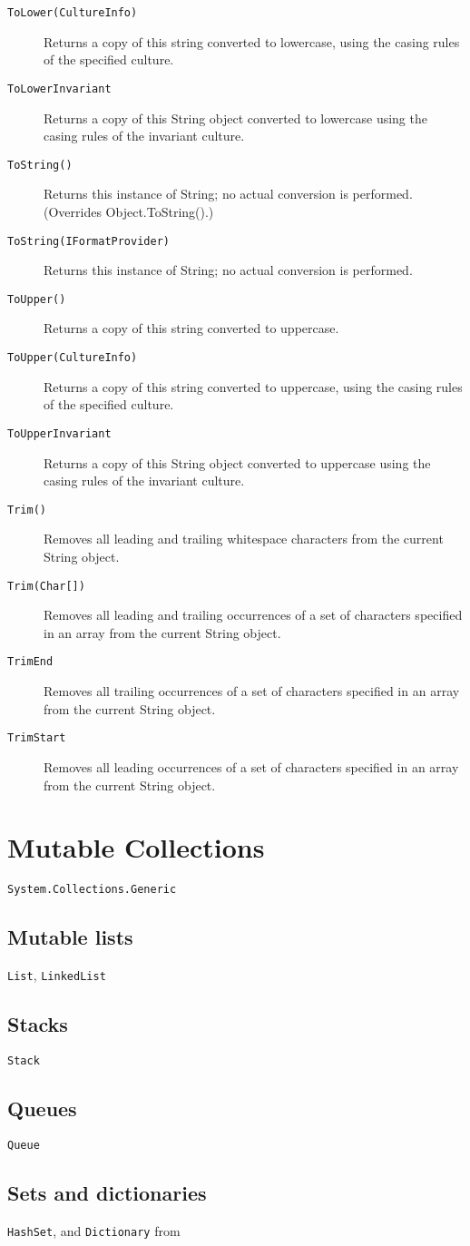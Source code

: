 \begin{description}
\item[\texttt{ToLower(CultureInfo)}] Returns a copy of this string converted to lowercase, using the casing rules of the specified culture.
\item[\texttt{ToLowerInvariant}] Returns a copy of this String object converted to lowercase using the casing rules of the invariant culture.
\item[\texttt{ToString()}] Returns this instance of String; no actual conversion is performed. (Overrides Object.ToString().)
\item[\texttt{ToString(IFormatProvider)}] Returns this instance of String; no actual conversion is performed.
\item[\texttt{ToUpper()}] Returns a copy of this string converted to uppercase.
\item[\texttt{ToUpper(CultureInfo)}] Returns a copy of this string converted to uppercase, using the casing rules of the specified culture.
\item[\texttt{ToUpperInvariant}] Returns a copy of this String object converted to uppercase using the casing rules of the invariant culture.
\item[\texttt{Trim()}] Removes all leading and trailing whitespace characters from the current String object.
\item[\texttt{Trim(Char[])}] Removes all leading and trailing occurrences of a set of characters specified in an array from the current String object.
\item[\texttt{TrimEnd}] Removes all trailing occurrences of a set of characters specified in an array from the current String object.
\item[\texttt{TrimStart}] Removes all leading occurrences of a set of characters specified in an array from the current String object.
\end{description}

\section{Mutable Collections}
\verb|System.Collections.Generic|
\subsection{Mutable lists}
\verb|List|,  \verb|LinkedList|
\subsection{Stacks}
\verb|Stack|
\subsection{Queues}  
\verb|Queue|
\subsection{Sets and dictionaries}
\verb|HashSet|,  and \verb|Dictionary| from  

